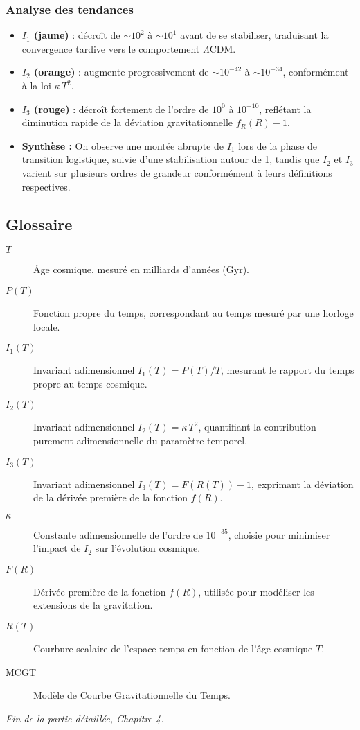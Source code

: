 \subsubsection*{Analyse des tendances}
\begin{itemize}
  \item \textbf{\(I_{1}\) (jaune)} :  
    décroît de \(\sim10^{2}\) à \(\sim10^{1}\) avant de se stabiliser, traduisant la convergence tardive vers le comportement \(\Lambda\)CDM.
  \item \textbf{\(I_{2}\) (orange)} :  
    augmente progressivement de \(\sim10^{-42}\) à \(\sim10^{-34}\), conformément à la loi \(\kappa\,T^{2}\).
  \item \textbf{\(I_{3}\) (rouge)} :  
    décroît fortement de l’ordre de \(10^{0}\) à \(10^{-10}\), reflétant la diminution rapide de la déviation gravitationnelle \(f_{R}(R)-1\).
  \item \textbf{Synthèse :}  
    On observe une montée abrupte de \(I_{1}\) lors de la phase de transition logistique, suivie d’une stabilisation autour de 1, tandis que \(I_{2}\) et \(I_{3}\) varient sur plusieurs ordres de grandeur conformément à leurs définitions respectives.
\end{itemize}

\subsection*{Glossaire}

\begin{description}
  \item[$T$] Âge cosmique, mesuré en milliards d’années (Gyr).
  \item[$P(T)$] Fonction propre du temps, correspondant au temps mesuré par une horloge locale.
  \item[$I_{1}(T)$] Invariant adimensionnel $I_{1}(T)=P(T)/T$, mesurant le rapport du temps propre au temps cosmique.
  \item[$I_{2}(T)$] Invariant adimensionnel $I_{2}(T)=\kappa\,T^{2}$, quantifiant la contribution purement adimensionnelle du paramètre temporel.
  \item[$I_{3}(T)$] Invariant adimensionnel $I_{3}(T)=F(R(T))-1$, exprimant la déviation de la dérivée première de la fonction $f(R)$.
  \item[$\kappa$] Constante adimensionnelle de l’ordre de $10^{-35}$, choisie pour minimiser l’impact de $I_{2}$ sur l’évolution cosmique.
  \item[$F(R)$] Dérivée première de la fonction $f(R)$, utilisée pour modéliser les extensions de la gravitation.
  \item[$R(T)$] Courbure scalaire de l’espace-temps en fonction de l’âge cosmique $T$.
  \item[MCGT] Modèle de Courbe Gravitationnelle du Temps.
\end{description}

\bigskip
\noindent\emph{Fin de la partie détaillée, Chapitre 4.}